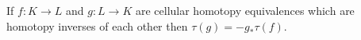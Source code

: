 If $f: K \rightarrow L$ and $g: L \rightarrow K$ are cellular homotopy equivalences which are homotopy inverses of each other then $\tau(g) = -g_* \tau(f)$.
